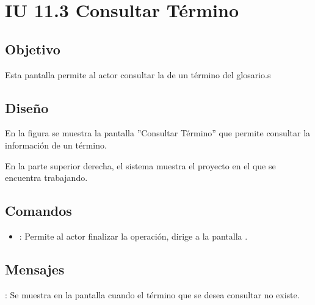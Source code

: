 \section{IU 11.3 Consultar Término}

\subsection{Objetivo}
	Esta pantalla permite al actor consultar la de un término del glosario.s
\subsection{Diseño}
	En la figura  se muestra la pantalla ''Consultar Término'' que permite consultar la información de un término.
	
	En la parte superior derecha, el sistema muestra el proyecto en el que se encuentra trabajando.

\subsection{Comandos}
\begin{itemize}
	\item {}: Permite al actor finalizar la operación, dirige a la pantalla .
\end{itemize}

\subsection{Mensajes}

\begin{Citemize}
	\item {}: Se muestra en la pantalla  cuando el término que se desea consultar no existe.
\end{Citemize}
